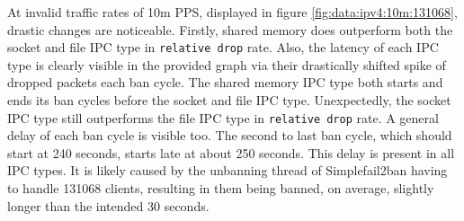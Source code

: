 At invalid traffic rates of 10m \ac{PPS}, displayed in figure \ref{fig:data:ipv4:10m:131068}, drastic changes are noticeable.
Firstly, shared memory does outperform both the socket and file \ac{IPC} type in \texttt{relative drop} rate.
Also, the latency of each \ac{IPC} type is clearly visible in the provided graph via their drastically shifted spike of dropped packets each ban cycle.
The shared memory \ac{IPC} type both starts and ends its ban cycles before the socket and file \ac{IPC} type.
Unexpectedly, the socket \ac{IPC} type still outperforms the file \ac{IPC} type in \texttt{relative drop} rate.
A general delay of each ban cycle is visible too.
The second to last ban cycle, which should start at 240 seconds, starts late at about 250 seconds.
This delay is present in all \ac{IPC} types. 
It is likely caused by the unbanning thread of Simplefail2ban having to handle 131068 clients, resulting in them being banned, on average, slightly longer than the intended 30 seconds.

